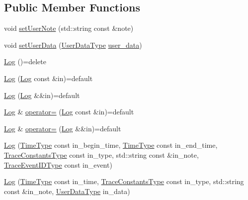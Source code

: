 \subsection*{Public Member Functions}
\begin{DoxyCompactItemize}
\item 
void \hyperlink{structvt_1_1trace_1_1_log_a823483c0dc5480368e03e89774a0ae9d}{set\+User\+Note} (std\+::string const \&note)
\item 
void \hyperlink{structvt_1_1trace_1_1_log_ae9ac348d526adb9f6c39d853cab5c3c3}{set\+User\+Data} (\hyperlink{structvt_1_1trace_1_1_log_af392c3825bf45d286a0f77bddf7a96cf}{User\+Data\+Type} \hyperlink{structvt_1_1trace_1_1_log_a7b251bc7dcebcbbafa29cc2ca6ea4c12}{user\+\_\+data})
\item 
\hyperlink{structvt_1_1trace_1_1_log_a60d449b9ab317e6b6bb93b4f0441fd2f}{Log} ()=delete
\item 
\hyperlink{structvt_1_1trace_1_1_log_a445abf4a0c8f48b1db961edf759566aa}{Log} (\hyperlink{structvt_1_1trace_1_1_log}{Log} const \&in)=default
\item 
\hyperlink{structvt_1_1trace_1_1_log_a7474e1eb2e7f2bfb879bb9e94773f82e}{Log} (\hyperlink{structvt_1_1trace_1_1_log}{Log} \&\&in)=default
\item 
\hyperlink{structvt_1_1trace_1_1_log}{Log} \& \hyperlink{structvt_1_1trace_1_1_log_aee97393891b92cb473bc4cee38542e52}{operator=} (\hyperlink{structvt_1_1trace_1_1_log}{Log} const \&in)=default
\item 
\hyperlink{structvt_1_1trace_1_1_log}{Log} \& \hyperlink{structvt_1_1trace_1_1_log_a49bd966fc97414a197f80a2cfbe55bb3}{operator=} (\hyperlink{structvt_1_1trace_1_1_log}{Log} \&\&in)=default
\item 
\hyperlink{structvt_1_1trace_1_1_log_a65544873c23cae6e8edf4b7b57785e48}{Log} (\hyperlink{namespacevt_a2b9f28078dc309ad0706b69ded743e69}{Time\+Type} const in\+\_\+begin\+\_\+time, \hyperlink{namespacevt_a2b9f28078dc309ad0706b69ded743e69}{Time\+Type} const in\+\_\+end\+\_\+time, \hyperlink{namespacevt_1_1trace_acf454dfbd581b0ebae895f90b5927a1d}{Trace\+Constants\+Type} const in\+\_\+type, std\+::string const \&in\+\_\+note, \hyperlink{namespacevt_1_1trace_a64a7185f3e102df8d8258f263ccd1582}{Trace\+Event\+I\+D\+Type} const in\+\_\+event)
\item 
\hyperlink{structvt_1_1trace_1_1_log_a3d0b33ca792eb0b06bae03b900487ec5}{Log} (\hyperlink{namespacevt_a2b9f28078dc309ad0706b69ded743e69}{Time\+Type} const in\+\_\+time, \hyperlink{namespacevt_1_1trace_acf454dfbd581b0ebae895f90b5927a1d}{Trace\+Constants\+Type} const in\+\_\+type, std\+::string const \&in\+\_\+note, \hyperlink{structvt_1_1trace_1_1_log_af392c3825bf45d286a0f77bddf7a96cf}{User\+Data\+Type} in\+\_\+data)

\end{DoxyCompactItemize}
